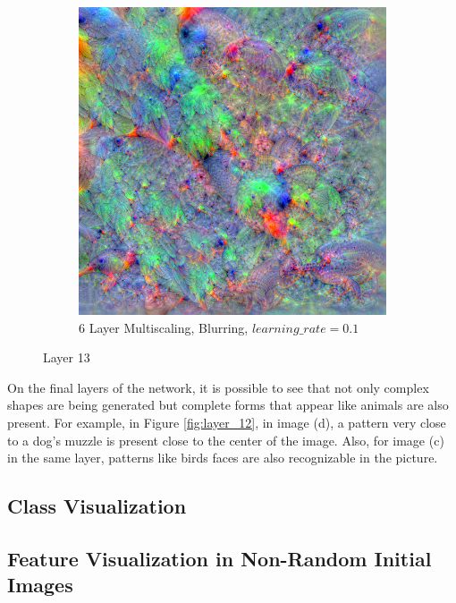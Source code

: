 \begin{figure}
\begin{subfigure}[t]{0.31\textwidth}
    \end{subfigure}
    \hfill
    \begin{subfigure}[t]{0.31\textwidth}
        \captionsetup{justification=centering}
        \centering
        \includegraphics[width=.7\linewidth]{figuras/feat_vis/experiments/final/l13/random_image_pl6_lr1e-1_layer28_blur-0.4.png}
        \caption{6 Layer Multiscaling, Blurring, \(learning\_rate = 0.1\)}
    \end{subfigure}

    \caption{Layer 13}
    \label{fig:layer_13}
\end{figure}
 
On the final layers of the network, it is possible to see that not only complex shapes are being generated but complete forms that appear like animals are also present.
For example, in Figure \ref{fig:layer_12}, in image (d), a pattern very close to a dog's muzzle is present close to the center of the image. 
Also, for image (c) in the same layer, patterns like birds faces are also recognizable in the picture.

\subsection{Class Visualization}

\subsection{Feature Visualization in Non-Random Initial Images}

